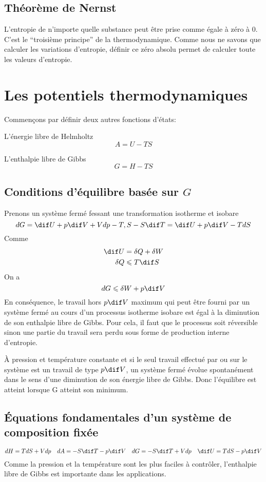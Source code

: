 \subsection{Théorème de Nernst}
L'entropie de n'importe quelle substance peut être prise
comme égale à zéro à \si{0}{\kelvin}.
C'est le ``troisième principe'' de la thermodynamique.
Comme nous ne savons que calculer les variations d'entropie,
définir ce zéro absolu permet de calculer toute les valeurs d'entropie.

\section{Les potentiels thermodynamiques}
Commençons par définir deux autres fonctions d'états:

L'énergie libre de Helmholtz
\[ A = U-TS \]

L'enthalpie libre de Gibbs
\[ G = H-TS \]

\subsection{Conditions d'équilibre basée sur $G$}
Prenons un système fermé fessant une transformation isotherme et isobare
\[ dG = \dif U+p\dif V+Vdp-T,S-S\dif T = \dif U+p\dif V-TdS \]
Comme
\begin{align*}
\dif U & = \delta Q+\delta W\\
\delta Q & \leqslant T\dif S
\end{align*}
On a
\[ dG \leqslant \delta W + p\dif V \]
En conséquence, le travail hors $p\dif V$ maximum qui peut être fourni
par un système fermé au cours d'un processus isotherme isobare est égal
à la diminution de son enthalpie libre de Gibbs.
Pour cela, il faut que le processus soit réversible sinon une partie
du travail sera perdu sous forme de production interne d'entropie.

À pression et température constante et si le seul travail effectué par
ou sur le système est un travail de type $p\dif V$,
un système fermé évolue spontanément dans le sens
d'une diminution de son énergie libre de Gibbs.
Donc l'équilibre est atteint lorsque G atteint son minimum.

\subsection{Équations fondamentales d'un système de composition fixée}
\[ dH = TdS+Vdp \quad dA = -S\dif T -p\dif V \quad
dG = -S\dif T +Vdp \quad \dif U = TdS-p\dif V \]
Comme la pression et la température sont les plus faciles à contrôler,
l'enthalpie libre de Gibbs est importante dans les applications.

